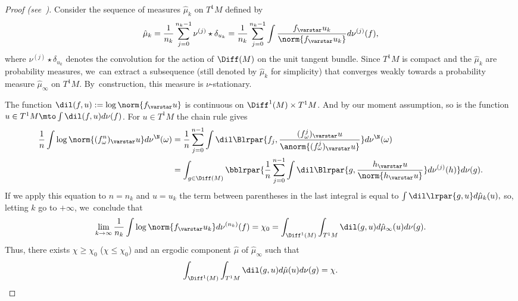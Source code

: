 \begin{proof}[Proof (see~\cite{chung, hurtado:burnside})]
Consider the
sequence of measures $\hat\mu_k$ on $T^1M$ defined by
\begin{equation*}
\hat\mu_k=\frac{1}{n_k} \sum_{j=0}^{n_k-1} \nu^{(j)}\star \delta_{u_k} =\frac{1}{n_k} \sum_{j=0}^{n_k-1}\int \frac{f_\varstar u_k}{\norm{f_\varstar u_k}} d\nu^{(j)}(f),
\end{equation*}
where $\nu^{(j)}\star \delta_{u_k}$ denotes the convolution for the action of $\Diff(M)$ on the unit tangent bundle. Since $T^1M$ is compact and the
$\hat\mu_k$ are probability measures, we~can extract a subsequence (still denoted by $\hat\mu_k$ for simplicity) that converges weakly towards a
probability measure $\hat\mu_\infty$ on $T^1M$. By~construction, this measure is $\nu$-stationary.

The function $\dil(f, u):=\log\norm{f_\varstar u}$ is continuous on
$\Diff^1(M)\times T^1M$. And by our moment assumption, so is the function
$u\in T^1M \mto \int \dil(f, u) d\nu(f)$.
For $ u\in T^1M$ the chain rule gives
\begin{align*}\notag
\frac{1}{n} \int \log\norm{(f^n_\omega)_\varstar u} d\nu^{\N}(\omega) & = \frac{1}{n} \sum_{j=0}^{n-1} \int \dil\Blrpar{f_j, \frac{(f^j_\omega)_\varstar u}{\anorm{(f^j_\omega)_\varstar u}}} d\nu^{\N}(\omega) \\
& = \int_{g\in \Diff(M)} \bblrpar{\frac{1}{n} \sum_{j=0}^{n-1} \int \dil\Blrpar{g, \frac{h_\varstar u}{\norm{h_\varstar u}}} d\nu^{(j)}(h) } d\nu(g).
\end{align*}
If we apply this equation to $n=n_k$ and $u=u_k$ the term between parentheses in
the last integral is equal to
$
\int \dil\lrpar{g,u} d\hat\mu_k(u),
$
so, letting $k$ go to $+\infty$, we~conclude that
\begin{equation*}
\lim_{k\to\infty} \frac{1}{n_k} \int \log \norm{f_\varstar u_k} d\nu^{(n_k)}(f) = \chi_0=
\int_{\Diff^1(M)}\int_{T^1M} \dil(g,u) d\hat\mu_\infty(u) d\nu(g).
\end{equation*}
Thus, there exists $\chi\geq \chi_0$ (\resp $\chi\leq \chi_0$) and
an ergodic component $\hat\mu$ of $\hat\mu_\infty$
such that
\begin{equation*}
\int_{\Diff^1(M)}\int_{T^1M} \dil(g,u) d\hat\mu (u) d\nu(g) = \chi.
\end{equation*}


\end{proof}
